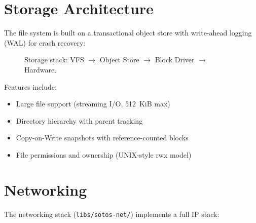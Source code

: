 \documentclass[11pt,letterpaper]{article}
\theoremstyle{definition}
\begin{document}
\section{Storage Architecture}
\label{sec:storage}

The file system is built on a transactional object store with write-ahead
logging (WAL) for crash recovery:

\begin{figure}[h]
\centering
{}
\caption{Storage stack: VFS $\to$ Object Store $\to$ Block Driver $\to$ Hardware.}
\label{fig:storage}
\end{figure}

Features include:
\begin{itemize}[nosep]
    \item Large file support (streaming I/O, 512~KiB max)
    \item Directory hierarchy with parent tracking
    \item Copy-on-Write snapshots with reference-counted blocks
    \item File permissions and ownership (UNIX-style rwx model)
\end{itemize}

\section{Networking}
\label{sec:net}

The networking stack (\texttt{libs/sotos-net/}) implements a full IP stack:
\end{document}
